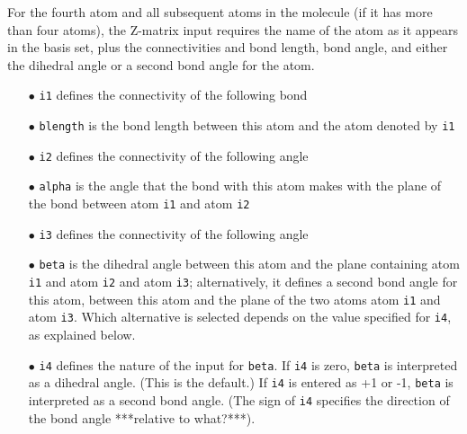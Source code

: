 \begin{enumerate}
    For the fourth atom and all subsequent atoms in the molecule (if it
    has more than four atoms), the Z-matrix input requires the name 
    of the atom as it appears in the basis set,
    plus the connectivities and bond length,
    bond angle, and either the dihedral angle or a second bond angle
    for the atom.
        
    \begin{itemize}
    \item [$\bullet$]  {\tt i1} defines the connectivity of the following bond  
    \item [$\bullet$]    {\tt blength} is the bond length between this atom and the atom denoted by {\tt i1}
    \item [$\bullet$]  {\tt i2} defines the connectivity of the following angle
    \item [$\bullet$]  {\tt alpha} is the angle that the bond with this atom 
makes with the plane of the bond between atom {\tt i1} and atom {\tt i2}  
    \item [$\bullet$]  {\tt i3} defines the connectivity of the following angle
    \item [$\bullet$]  {\tt beta}  is  the dihedral angle between
this atom and the plane containing atom {\tt i1} and atom {\tt i2} and atom 
        {\tt i3}; alternatively, it defines a second bond angle for this atom, between this atom 
and the plane of the two atoms atom {\tt i1} and atom {\tt i3}.  
Which alternative is selected depends on the value specified for {\tt i4}, as explained below. 
    \item [$\bullet$]  {\tt i4} defines the nature of the input for {\tt beta}.  If {\tt i4} is zero, 
{\tt beta} is interpreted as a dihedral
        angle.  (This is the default.)  If {\tt i4} is entered as +1 or -1, {\tt beta} 
is interpreted as a second bond angle.  (The sign of {\tt i4} specifies the 
direction of the bond angle ***relative to what?***).
    \end{itemize}


\end{enumerate}
